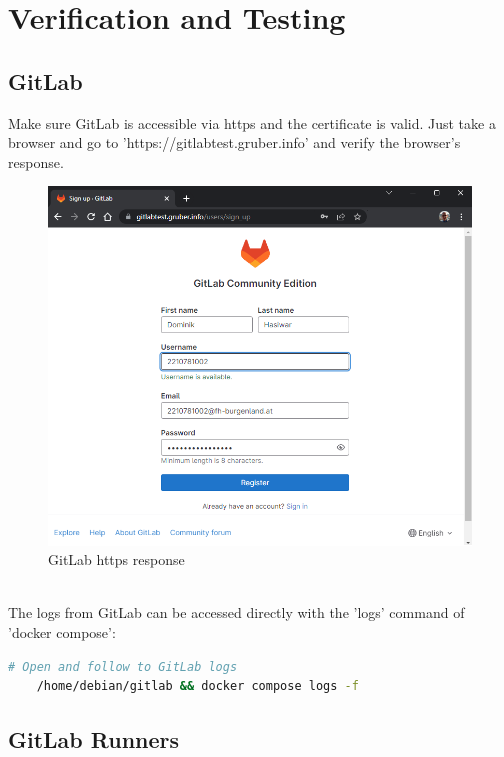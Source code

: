 \chapter{Verification and Testing}

\section{GitLab}

Make sure GitLab is accessible via https and the certificate is valid.
Just take a browser and go to 'https://gitlabtest.gruber.info' and verify the browser's response.

\begin{figure}[H]
	\centering
	\includegraphics[width=14cm]{images/gitlab_signup.png}
	\caption{GitLab https response}
	\label{fig:gitlab_response}
\end{figure}
\  \\

The logs from GitLab can be accessed directly with the 'logs' command of 'docker compose':
\begin{lstlisting}[language=bash,caption={GitLab Logging},label={code:gitlab-logging}]
    # Open and follow to GitLab logs
    /home/debian/gitlab && docker compose logs -f
\end{lstlisting}

\section{GitLab Runners}

